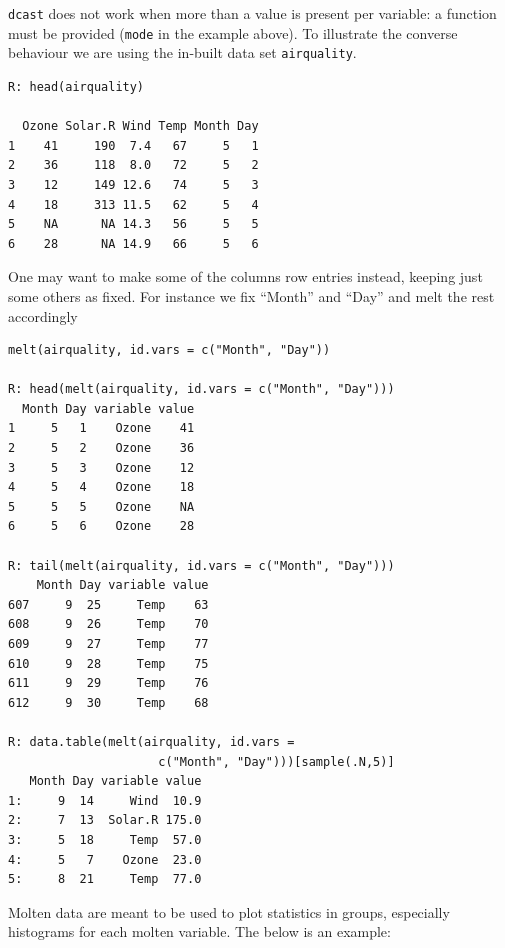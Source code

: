 \texttt{dcast} does not work when more than a value is
present per variable: a function must be provided
(\texttt{mode} in the example above). To illustrate
the converse behaviour we are using the in-built 
data set \texttt{airquality}.
\begin{verbatim}
R: head(airquality)

  Ozone Solar.R Wind Temp Month Day
1    41     190  7.4   67     5   1
2    36     118  8.0   72     5   2
3    12     149 12.6   74     5   3
4    18     313 11.5   62     5   4
5    NA      NA 14.3   56     5   5
6    28      NA 14.9   66     5   6
\end{verbatim}
One may want to make some of the columns row
entries instead, keeping just some others as
fixed. For instance we fix ``Month'' and 
``Day'' and melt the rest accordingly
\begin{verbatim}
melt(airquality, id.vars = c("Month", "Day")) 
 
R: head(melt(airquality, id.vars = c("Month", "Day")))
  Month Day variable value
1     5   1    Ozone    41
2     5   2    Ozone    36
3     5   3    Ozone    12
4     5   4    Ozone    18
5     5   5    Ozone    NA
6     5   6    Ozone    28

R: tail(melt(airquality, id.vars = c("Month", "Day")))
    Month Day variable value
607     9  25     Temp    63
608     9  26     Temp    70
609     9  27     Temp    77
610     9  28     Temp    75
611     9  29     Temp    76
612     9  30     Temp    68

R: data.table(melt(airquality, id.vars = 
                     c("Month", "Day")))[sample(.N,5)]
   Month Day variable value
1:     9  14     Wind  10.9
2:     7  13  Solar.R 175.0
3:     5  18     Temp  57.0
4:     5   7    Ozone  23.0
5:     8  21     Temp  77.0
\end{verbatim}
Molten data are meant to be used to plot
statistics in groups, especially histograms
for each molten variable. The below is an 
example:
